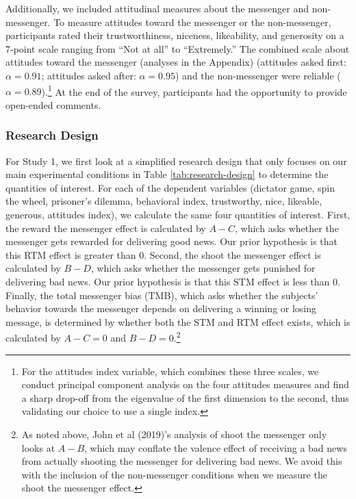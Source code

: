 Additionally, we included attitudinal measures about the messenger and
non-messenger. To measure attitudes toward the messenger or the
non-messenger, participants rated their trustworthiness, niceness,
likeability, and generosity on a 7-point scale ranging from ``Not at
all'' to ``Extremely.'' The combined scale about attitudes toward the
messenger (analyses in the Appendix) (attitudes asked first: $\alpha =
0.91$; attitudes asked after: $\alpha = 0.95$) and the non-messenger were
reliable ($\alpha = 0.89$).\footnote{For the attitudes index variable, which combines these three scales,
we conduct principal component analysis on the four attitudes measures 
and find a sharp drop-off from the eigenvalue of the first dimension
to the second, thus validating our choice to use a single index.} At the end of the survey, participants had the
opportunity to provide open-ended comments.

\subsubsection{Research Design}



For Study 1, we first look at a simplified research design that only
focuses on our main experimental conditions in Table \ref{tab:research-design} to determine the
quantities of interest. For each of the dependent variables (dictator
game, spin the wheel, prisoner's dilemma, behavioral index, trustworthy,
nice, likeable, generous, attitudes index), we calculate the same four
quantities of interest. First, the reward the messenger effect is
calculated by $A-C$, which asks whether the messenger gets rewarded
for delivering good news. Our prior hypothesis is that this RTM effect
is greater than 0. Second, the shoot the messenger effect is calculated
by $B-D$, which asks whether the messenger gets punished for
delivering bad news. Our prior hypothesis is that this STM effect is
less than 0. Finally, the total messenger bias (TMB), which asks whether
the subjects' behavior towards the messenger depends on delivering a
winning or losing message, is determined by whether both the STM and RTM
effect exists, which is calculated by $A-C = 0$ and $B-D =
0$.\footnote{As noted above, John et al (2019)'s analysis of shoot the
  messenger only looks at $A-B$, which may conflate the valence effect
  of receiving a bad news from actually shooting the messenger for
  delivering bad news. We avoid this with the inclusion of the
  non-messenger conditions when we measure the shoot the messenger
  effect.}

